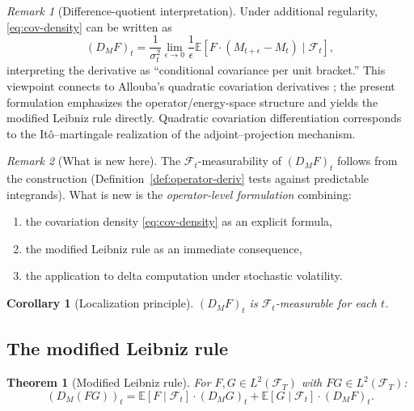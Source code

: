 \documentclass[11pt]{article}
\theoremstyle{plain}
\newtheorem{theorem}{Theorem}[section]
\newtheorem{corollary}{Corollary}[section]
\theoremstyle{definition}
\theoremstyle{remark}
\newtheorem{remark}{Remark}[section]
\newcommand{\E}{\mathbb{E}}
\newcommand{\F}{\mathcal{F}}
\begin{document}
\begin{remark}[Difference-quotient interpretation]
Under additional regularity, \eqref{eq:cov-density} can be written as
\[
(D_M F)_t = \frac{1}{\sigma_t^2} \lim_{\epsilon \to 0} \frac{1}{\epsilon}
\E[F \cdot (M_{t+\epsilon} - M_t) \mid \F_t],
\]
interpreting the derivative as ``conditional covariance per unit bracket.'' 
This viewpoint connects to Allouba's quadratic covariation derivatives 
\cite{Allouba2006}; the present formulation emphasizes the operator/energy-space 
structure and yields the modified Leibniz rule directly. Quadratic covariation 
differentiation corresponds to the It\^o--martingale realization of the 
adjoint--projection mechanism.
\end{remark}

\begin{remark}[What is new here]\label{rmk:whats-new}
The $\F_t$-measurability of $(D_M F)_t$ follows from the construction 
(Definition~\ref{def:operator-deriv} tests against predictable integrands). 
What is new is the \emph{operator-level formulation} combining:
\begin{enumerate}[label=(\alph*)]
\item the covariation density \eqref{eq:cov-density} as an explicit formula,
\item the modified Leibniz rule as an immediate consequence,
\item the application to delta computation under stochastic volatility.
\end{enumerate}
\end{remark}

\begin{corollary}[Localization principle]\label{cor:localization}
$(D_M F)_t$ is $\F_t$-measurable for each $t$.
\end{corollary}

\subsection{The modified Leibniz rule}

\begin{theorem}[Modified Leibniz rule]\label{thm:modified-leibniz}
For $F, G \in L^2(\F_T)$ with $FG \in L^2(\F_T)$:
\begin{equation}\label{eq:modified-leibniz}
(D_M(FG))_t = \E[F \mid \F_t] \cdot (D_M G)_t + \E[G \mid \F_t] \cdot (D_M F)_t.
\end{equation}
\end{theorem}
\end{document}

